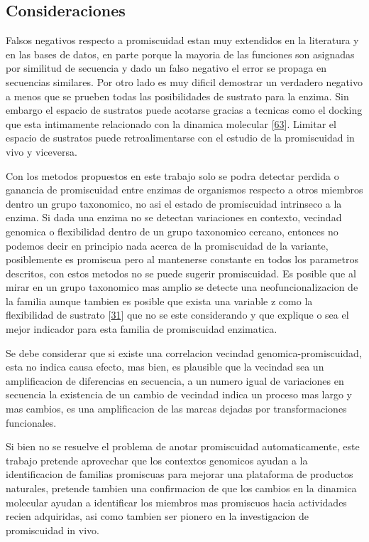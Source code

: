 \documentclass[12pt,twoside]{reedthesis}
\begin{document}
  \subsection{Consideraciones}\label{consideraciones}
  
  Falsos negativos respecto a promiscuidad estan muy extendidos en la
  literatura y en las bases de datos, en parte porque la mayoria de las
  funciones son asignadas por similitud de secuencia y dado un falso
  negativo el error se propaga en secuencias similares. Por otro lado es
  muy dificil demostrar un verdadero negativo a menos que se prueben todas
  las posibilidades de sustrato para la enzima. Sin embargo el espacio de
  sustratos puede acotarse gracias a tecnicas como el docking que esta
  intimamente relacionado con la dinamica molecular
  {[}\protect\hyperlink{ref-campbell_biophysical_2012}{63}{]}. Limitar el
  espacio de sustratos puede retroalimentarse con el estudio de la
  promiscuidad in vivo y viceversa.
  
  Con los metodos propuestos en este trabajo solo se podra detectar
  perdida o ganancia de promiscuidad entre enzimas de organismos respecto
  a otros miembros dentro un grupo taxonomico, no asi el estado de
  promiscuidad intrinseco a la enzima. Si dada una enzima no se detectan
  variaciones en contexto, vecindad genomica o flexibilidad dentro de un
  grupo taxonomico cercano, entonces no podemos decir en principio nada
  acerca de la promiscuidad de la variante, posiblemente es promiscua pero
  al mantenerse constante en todos los parametros descritos, con estos
  metodos no se puede sugerir promiscuidad. Es posible que al mirar en un
  grupo taxonomico mas amplio se detecte una neofuncionalizacion de la
  familia aunque tambien es posible que exista una variable z como la
  flexibilidad de sustrato
  {[}\protect\hyperlink{ref-nobeli_protein_2009}{31}{]} que no se este
  considerando y que explique o sea el mejor indicador para esta familia
  de promiscuidad enzimatica.
  
  Se debe considerar que si existe una correlacion vecindad
  genomica-promiscuidad, esta no indica causa efecto, mas bien, es
  plausible que la vecindad sea un amplificacion de diferencias en
  secuencia, a un numero igual de variaciones en secuencia la existencia
  de un cambio de vecindad indica un proceso mas largo y mas cambios, es
  una amplificacion de las marcas dejadas por transformaciones
  funcionales.
  
  Si bien no se resuelve el problema de anotar promiscuidad
  automaticamente, este trabajo pretende aprovechar que los contextos
  genomicos ayudan a la identificacion de familias promiscuas para mejorar
  una plataforma de productos naturales, pretende tambien una confirmacion
  de que los cambios en la dinamica molecular ayudan a identificar los
  miembros mas promiscuos hacia actividades recien adquiridas, asi como
  tambien ser pionero en la investigacion de promiscuidad in vivo.
  
\end{document}
